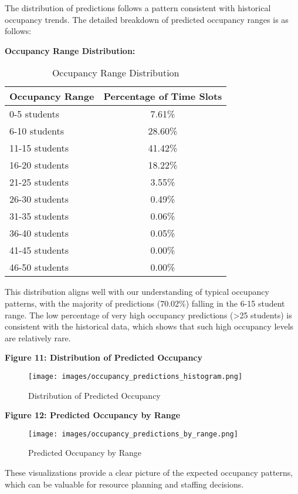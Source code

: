 \documentclass[12pt,letterpaper]{article}
\begin{document}
The distribution of predictions follows a pattern consistent with historical occupancy trends. The detailed breakdown of predicted occupancy ranges is as follows:

\textbf{Occupancy Range Distribution:}
\begin{table}[H]
\centering
\begin{tabular}{lc}
\toprule
\textbf{Occupancy Range} & \textbf{Percentage of Time Slots} \\
\midrule
0-5 students    & 7.61\% \\
6-10 students   & 28.60\% \\
11-15 students  & 41.42\% \\
16-20 students  & 18.22\% \\
21-25 students  & 3.55\% \\
26-30 students  & 0.49\% \\
31-35 students  & 0.06\% \\
36-40 students  & 0.05\% \\
41-45 students  & 0.00\% \\
46-50 students  & 0.00\% \\
\bottomrule
\end{tabular}
\caption{Occupancy Range Distribution}
\end{table}

This distribution aligns well with our understanding of typical occupancy patterns, with the majority of predictions (70.02\%) falling in the 6-15 student range. The low percentage of very high occupancy predictions (>25 students) is consistent with the historical data, which shows that such high occupancy levels are relatively rare.

\textbf{Figure 11: Distribution of Predicted Occupancy}

\begin{figure}[H]
    \centering
    \texttt{[image: images/occupancy\_predictions\_histogram.png]}
    \caption{Distribution of Predicted Occupancy}
\end{figure}

\textbf{Figure 12: Predicted Occupancy by Range}

\begin{figure}[H]
    \centering
    \texttt{[image: images/occupancy\_predictions\_by\_range.png]}
    \caption{Predicted Occupancy by Range}
\end{figure}

These visualizations provide a clear picture of the expected occupancy patterns, which can be valuable for resource planning and staffing decisions.
\end{document}
